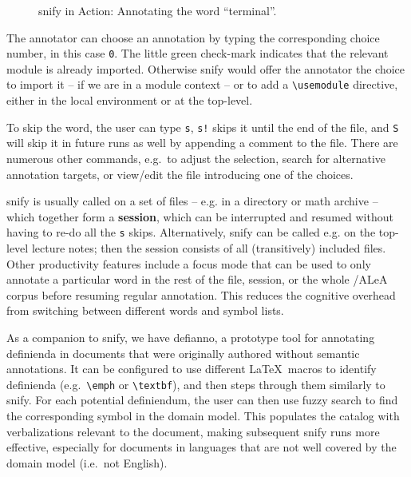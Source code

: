 \documentclass[runningheads]{llncs}
\newcommand\ALeA{\textsf{ALeA}\xspace}
\newcommand\snify{\textsf{snify}\xspace}
\newcommand\defianno{\textsf{defianno}\xspace}
\begin{document}
\begin{figure}[ht]
  \setlength{\fboxsep}{0pt}
  \caption{\snify in Action: Annotating the word ``terminal''.}\label{fig:snify}
\end{figure}

The annotator can choose an annotation by typing the corresponding choice number,
in this case \lstinline|0|.
The little green check-mark indicates that the relevant module is already imported.
Otherwise \snify would offer the annotator the choice to import it -- if we are
in a module context -- or to add a \lstinline|\usemodule| directive, either in the
local environment or at the top-level.

To skip the word, the user can type \lstinline|s|,
\lstinline|s!| skips it until the end of the file, and \lstinline|S|
will skip it in future runs as well by appending a comment to the file.
There are numerous other commands, e.g.\ to adjust the selection,
search for alternative annotation targets,
or view/edit the file introducing one of the choices.

\snify is usually called on a set of files -- e.g. in a directory or math archive -- which
together form a \textbf{session}, which can be interrupted and resumed without having to
re-do all the \lstinline|s| skips. Alternatively, \snify can be called e.g. on the top-level
lecture notes; then the session consists of all (transitively) included files. Other productivity
features include a focus mode that can be used to only annotate a particular word in the
rest of the file, session, or the whole \sTeX/\ALeA corpus before resuming regular
annotation. This reduces the cognitive overhead from switching between different 
words and symbol lists.

As a companion to \snify,
we have \defianno, a prototype tool for annotating definienda in documents
that were originally authored without semantic annotations.
It can be configured to use different \LaTeX\ macros
to identify definienda (e.g.\ \lstinline|\emph| or \lstinline|\textbf|),
and then steps through them similarly to \snify.
For each potential definiendum, the user can then use fuzzy search to find
the corresponding symbol in the domain model.
This populates the catalog with verbalizations relevant to the document,
making subsequent \snify runs more effective,
especially for documents in languages that are not well covered by the
domain model (i.e.\ not English).
\end{document}
